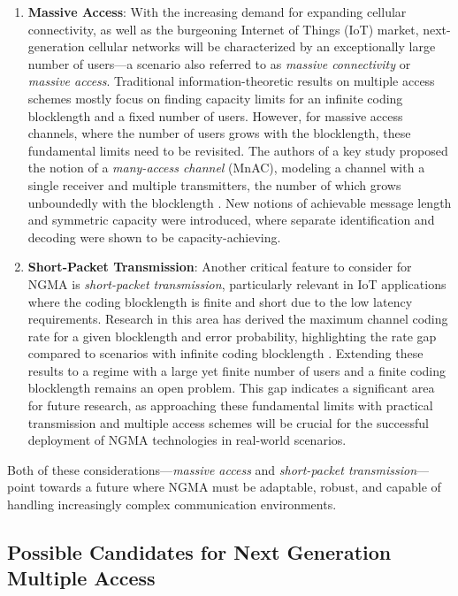\begin{enumerate}
    \item \textbf{Massive Access}: With the increasing demand for expanding cellular connectivity, as well as the burgeoning Internet of Things (IoT) market, next-generation cellular networks will be characterized by an exceptionally large number of users—a scenario also referred to as \textit{massive connectivity} or \textit{massive access}. Traditional information-theoretic results on multiple access schemes mostly focus on finding capacity limits for an infinite coding blocklength and a fixed number of users. However, for massive access channels, where the number of users grows with the blocklength, these fundamental limits need to be revisited. The authors of a key study proposed the notion of a \textit{many-access channel} (MnAC), modeling a channel with a single receiver and multiple transmitters, the number of which grows unboundedly with the blocklength \cite{NAGMA}. New notions of achievable message length and symmetric capacity were introduced, where separate identification and decoding were shown to be capacity-achieving.
    
    \item \textbf{Short-Packet Transmission}: Another critical feature to consider for NGMA is \textit{short-packet transmission}, particularly relevant in IoT applications where the coding blocklength is finite and short due to the low latency requirements. Research in this area has derived the maximum channel coding rate for a given blocklength and error probability, highlighting the rate gap compared to scenarios with infinite coding blocklength \cite{nagma2}. Extending these results to a regime with a large yet finite number of users and a finite coding blocklength remains an open problem. This gap indicates a significant area for future research, as approaching these fundamental limits with practical transmission and multiple access schemes will be crucial for the successful deployment of NGMA technologies in real-world scenarios.
\end{enumerate}

Both of these considerations—\textit{massive access} and \textit{short-packet transmission}—point towards a future where NGMA must be adaptable, robust, and capable of handling increasingly complex communication environments.
\subsection{Possible Candidates for Next Generation Multiple Access}

